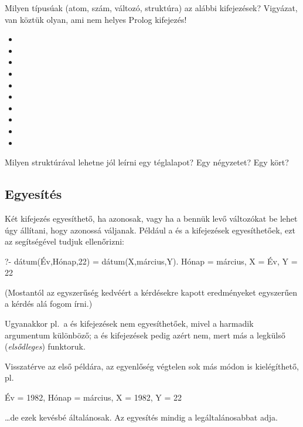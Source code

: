 \begin{problem}
Milyen típusúak (atom, szám, változó, struktúra) az
alábbi kifejezések? Vigyázat, van köztük olyan, ami
nem helyes Prolog kifejezés!
\begin{itemize}
\item {}
\item {}
\item {}
\item {}
\item {}
\item {}
\item {}
\item {}
\item {}
\item {}
\end{itemize}
\end{problem}
\begin{problem}
Milyen struktúrával lehetne jól leírni egy
téglalapot? Egy négyzetet? Egy kört?
\end{problem}

\subsection*{Egyesítés}
Két kifejezés egyesíthető, ha azonosak, vagy ha a
bennük levő változókat be lehet úgy állítani, hogy
azonossá váljanak. Például a 
és a  kifejezések
egyesíthetőek, ezt az \pr{=} segítségével tudjuk
ellenőrizni:\index{\pr{=}}
\begin{query}
?- dátum(Év,Hónap,22) = dátum(X,március,Y).
Hónap = március,
X = Év,
Y = 22
\end{query}
(Mostantól az egyszerűség kedvéért a kérdésekre
kapott eredményeket egyszerűen a kérdés alá fogom
írni.)

Ugyanakkor pl.~a  és
 kifejezések nem egyesíthetőek,
mivel a harmadik argumentum különböző; a
 és  kifejezések
pedig azért nem, mert más a legkülső
(\emph{elsődleges}) funktoruk.

Visszatérve az első példára, az egyenlőség végtelen
sok más módon is kielégíthető, pl.
\begin{query}
Év = 1982,
Hónap = március,
X = 1982,
Y = 22
\end{query}
\dots de ezek kevésbé általánosak. Az egyesítés
mindig a legáltalánosabbat adja.


